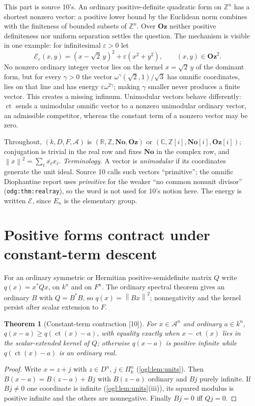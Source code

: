 \documentclass[11pt,oneside]{article}
\numberwithin{equation}{section}
\newtheorem{theorem}{Theorem}[section]
\theoremstyle{definition}
\theoremstyle{remark}
\newcommand{\No}{\mathbf{No}}
\newcommand{\Oz}{\mathbf{Oz}}
\newcommand{\GOz}{\mathbf{Oz}[i]}
\newcommand{\SC}{\No[i]}
\newcommand{\Z}{\mathbb Z}
\newcommand{\R}{\mathbb R}
\newcommand{\C}{\mathbb C}
\newcommand{\A}{\mathcal A}
\newcommand{\cE}{\mathcal E}
\newcommand{\ct}{\operatorname{ct}}
\newcommand{\norm}[1]{\left\lVert #1\right\rVert}
\newcommand{\src}[1]{\textup{\textsf{\small[#1]}}}
\newcommand{\replabel}[1]{\nolinkurl{#1}}
\begin{document}
This part is source 10's. An ordinary positive-definite quadratic form on $\Z^n$
has a shortest nonzero vector: a positive lower bound by the Euclidean norm
combines with the finiteness of bounded subsets of $\Z^n$. Over $\Oz$ neither
positive definiteness nor uniform separation settles the question. The mechanism
is visible in one example: for infinitesimal $\varepsilon>0$ let
\begin{equation}\label{ogl:lat:eq:introexample}
 \cE_\varepsilon(x,y)=(x-\sqrt2\,y)^2+\varepsilon(x^2+y^2),\qquad(x,y)\in\Oz^2 .
\end{equation}
No nonzero ordinary integer vector lies on the kernel $x=\sqrt2\,y$ of the
dominant form, but for every $\gamma>0$ the vector
$\omega^\gamma(\sqrt2,1)/\sqrt3$ has omnific coordinates, lies on that line and
has energy $\varepsilon\omega^{2\gamma}$; making $\gamma$ smaller never produces
a finite vector. This creates a missing infimum. Unimodular vectors behave
differently: $\ct$ sends a unimodular omnific vector to a nonzero unimodular
ordinary vector, an admissible competitor, whereas the constant term of a
nonzero vector may be zero.

Throughout, $(k,D,F,\A)$ is $(\R,\Z,\No,\Oz)$ or $(\C,\Z[i],\SC,\GOz)$;
conjugation is trivial in the real row and fixes $\No$ in the complex row, and
$\norm{x}^2=\sum_\ell\overline{x_\ell}x_\ell$. \emph{Terminology.} A vector is
\emph{unimodular} if its coordinates generate the unit ideal. Source 10 calls
such vectors ``primitive''; the omnific Diophantine report uses
\emph{primitive} for the weaker ``no common nonunit divisor''
(\replabel{odg:thm:realray}), so the word is not used for 10's notion here. The
energy is written $\cE$, since $E_n$ is the elementary group.

\section{Positive forms contract under constant-term descent}\label{ogl:lat:sec:descent}

For an ordinary symmetric or Hermitian positive-semidefinite matrix $Q$ write
$q(x)=x^*Qx$, on $k^n$ and on $F^n$. The ordinary spectral theorem gives an
ordinary $B$ with $Q=B^*B$, so $q(x)=\norm{Bx}^2$; nonnegativity and the kernel
persist after scalar extension to $F$.

\begin{theorem}[Constant-term contraction \src{10}]\label{ogl:lat:thm:contraction}
For $x\in\A^n$ and ordinary $a\in k^n$,
$q(x-a)\ge q(\ct(x)-a)$, with equality exactly when $x-\ct(x)$ lies in the
scalar-extended kernel of $Q$; otherwise $q(x-a)$ is positive infinite while
$q(\ct(x)-a)$ is an ordinary real.
\end{theorem}
\begin{proof}
Write $x=z+j$ with $z\in D^n$, $j\in\Pi_k^n$ (\cref{ogl:lem:units}). Then
$B(x-a)=B(z-a)+Bj$ with $B(z-a)$ ordinary and $Bj$ purely infinite. If $Bj\ne0$
one coordinate is infinite (\cref{ogl:lem:units}(iii)), its squared modulus is
positive infinite and the others are nonnegative. Finally $Bj=0$ iff $Qj=0$.
\end{proof}
\end{document}
